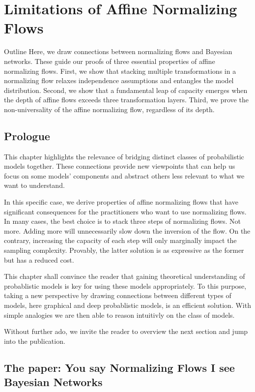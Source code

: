 \chapter{Limitations of Affine Normalizing Flows}\label{ch:04}

\begin{remark}{Outline}
  Here, we draw connections between normalizing flows and Bayesian networks. These guide our proofs of three essential properties of affine normalizing flows.
  First, we show that stacking multiple transformations in a normalizing flow relaxes independence assumptions and entangles the model distribution.
  Second, we show that a fundamental leap of capacity emerges when the depth of affine flows exceeds three transformation layers.
  Third, we prove the non-universality of the affine normalizing flow, regardless of its depth.
\end{remark}

\section{Prologue}
This chapter highlights the relevance of bridging distinct classes of probabilistic models together. These connections provide new viewpoints that can help us focus on some models' components and abstract others less relevant to what we want to understand.

In this specific case, we derive properties of affine normalizing flows that have significant consequences for the practitioners who want to use normalizing flows. In many cases, the best choice is to stack three steps of normalizing flows. Not more. Adding more will unnecessarily slow down the inversion of the flow. On the contrary, increasing the capacity of each step will only marginally impact the sampling complexity. Provably, the latter solution is as expressive as the former but has a reduced cost.

This chapter shall convince the reader that gaining theoretical understanding of probablistic models is key for using these models appropriately. To this purpose, taking a new perspective by drawing connections between different types of models, here graphical and deep probablistic models, is an efficient solution. With simple analogies we are then able to reason intuitivly on the class of models.

Without further ado, we invite the reader to overview the next section and jump into the publication.
\section{The paper: You say Normalizing Flows I see Bayesian Networks}

